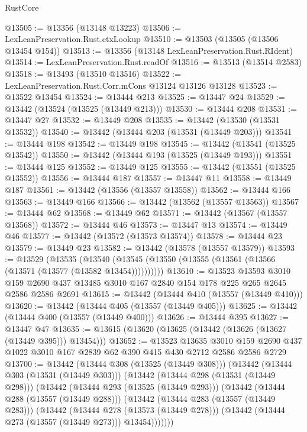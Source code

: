 \begin{lexlean}{RustCore}
\begin{coremodule}
@13505 := @13356 (@13148 @13223)
@13506 := LexLeanPreservation.Rust.ctxLookup
@13510 := @13503 (@13505 (@13506 @13454 @154))
@13513 := @13356 (@13148 LexLeanPreservation.Rust.RIdent)
@13514 := LexLeanPreservation.Rust.readOf
@13516 := @13513 (@13514 @2583)
@13518 := @13493 (@13510 @13516)
@13522 := LexLeanPreservation.Rust.Corr.mCons @13124 @13126 @13128
@13523 := @13522 @13454
@13524 := @13444 @213
@13525 := @13447 @24
@13529 := @13442 (@13524 (@13525 (@13449 @213)))
@13530 := @13444 @208
@13531 := @13447 @27
@13532 := @13449 @208
@13535 := @13442 (@13530 (@13531 @13532))
@13540 := @13442 (@13444 @203 (@13531 (@13449 @203)))
@13541 := @13444 @198
@13542 := @13449 @198
@13545 := @13442 (@13541 (@13525 @13542))
@13550 := @13442 (@13444 @193 (@13525 (@13449 @193)))
@13551 := @13444 @125
@13552 := @13449 @125
@13555 := @13442 (@13551 (@13525 @13552))
@13556 := @13444 @187
@13557 := @13447 @11
@13558 := @13449 @187
@13561 := @13442 (@13556 (@13557 @13558))
@13562 := @13444 @166
@13563 := @13449 @166
@13566 := @13442 (@13562 (@13557 @13563))
@13567 := @13444 @62
@13568 := @13449 @62
@13571 := @13442 (@13567 (@13557 @13568))
@13572 := @13444 @46
@13573 := @13447 @13
@13574 := @13449 @46
@13577 := @13442 (@13572 (@13573 @13574))
@13578 := @13444 @23
@13579 := @13449 @23
@13582 := @13442 (@13578 (@13557 @13579))
@13593 := @13529
    (@13535 (@13540 (@13545 (@13550 (@13555 (@13561 (@13566 (@13571 (@13577 (@13582 @13454))))))))))
@13610 := @13523
    @13593
    @3010
    @159
    @2690
    @437
    @13485
    @3010
    @167
    @2840
    @154
    @178
    @225
    @265
    @2645
    @2586
    @2586
    @2691
@13615 := @13442 (@13444 @410 (@13557 (@13449 @410)))
@13620 := @13442 (@13444 @405 (@13557 (@13449 @405)))
@13625 := @13442 (@13444 @400 (@13557 (@13449 @400)))
@13626 := @13444 @395
@13627 := @13447 @47
@13635 := @13615 (@13620 (@13625 (@13442 (@13626 (@13627 (@13449 @395))) @13454)))
@13652 := @13523
    @13635
    @3010
    @159
    @2690
    @437
    @1022
    @3010
    @167
    @2839
    @62
    @390
    @415
    @430
    @2712
    @2586
    @2586
    @2729
@13700 := @13442
    (@13444 @308 (@13525 (@13449 @308)))
    (@13442
      (@13444 @303 (@13531 (@13449 @303)))
      (@13442
        (@13444 @298 (@13531 (@13449 @298)))
        (@13442
          (@13444 @293 (@13525 (@13449 @293)))
          (@13442
            (@13444 @288 (@13557 (@13449 @288)))
            (@13442
              (@13444 @283 (@13557 (@13449 @283)))
              (@13442
                (@13444 @278 (@13573 (@13449 @278)))
                (@13442 (@13444 @273 (@13557 (@13449 @273))) @13454)))))))

\end{coremodule}
\end{lexlean}
